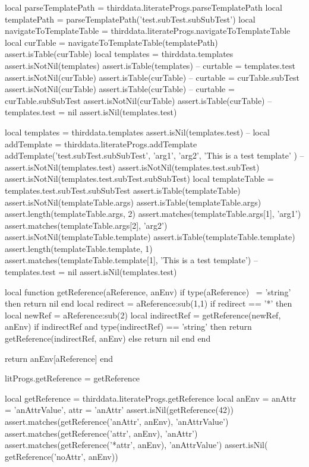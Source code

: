 {{
\startLuaTest
local parseTemplatePath = thirddata.literateProgs.parseTemplatePath
local templatePath = parseTemplatePath('test.subTest.subSubTest')
local navigateToTemplateTable = thirddata.literateProgs.navigateToTemplateTable
local curTable = navigateToTemplateTable(templatePath)
assert.isTable(curTable)
local templates = thirddata.templates
assert.isNotNil(templates)
assert.isTable(templates)
--
curtable = templates.test
assert.isNotNil(curTable)
assert.isTable(curTable)
--
curtable = curTable.subTest
assert.isNotNil(curTable)
assert.isTable(curTable)
--
curtable = curTable.subSubTest
assert.isNotNil(curTable)
assert.isTable(curTable)
--
templates.test = nil
assert.isNil(templates.test)
\stopLuaTest
\stopTestCase

\startLuaTest
local templates = thirddata.templates
assert.isNil(templates.test)
--
local addTemplate = thirddata.literateProgs.addTemplate
addTemplate('test.subTest.subSubTest',
  { 'arg1', 'arg2'},
  'This is a test template'
)
--
assert.isNotNil(templates.test)
assert.isNotNil(templates.test.subTest)
assert.isNotNil(templates.test.subTest.subSubTest)
local templateTable = templates.test.subTest.subSubTest
assert.isTable(templateTable)
assert.isNotNil(templateTable.args)
assert.isTable(templateTable.args)
assert.length(templateTable.args, 2)
assert.matches(templateTable.args[1], 'arg1')
assert.matches(templateTable.args[2], 'arg2')
assert.isNotNil(templateTable.template)
assert.isTable(templateTable.template)
assert.length(templateTable.template, 1)
assert.matches(templateTable.template[1], 'This is a test template')
--
templates.test = nil
assert.isNil(templates.test)
\stopLuaTest
\stopTestCase

\stopTestSuite

\startTestSuite[renderer]

\startLuaCode
local function getReference(aReference, anEnv)
  if type(aReference) ~= 'string' then return nil end
  local redirect = aReference:sub(1,1)
  if redirect == '*' then
    local newRef = aReference:sub(2)
    local indirectRef = getReference(newRef, anEnv)
    if indirectRef and type(indirectRef) == 'string' then
      return getReference(indirectRef, anEnv)
    else
      return nil
    end
  end

  return anEnv[aReference]
end

litProgs.getReference = getReference
\stopLuaCode

\startLuaTest
local getReference = thirddata.literateProgs.getReference
local anEnv = { 
  anAttr = 'anAttrValue',
  attr   = 'anAttr'
}
assert.isNil(getReference(42))
assert.matches(getReference('anAttr', anEnv), 'anAttrValue')
assert.matches(getReference('attr',   anEnv), 'anAttr')
assert.matches(getReference('*attr',  anEnv), 'anAttrValue')
assert.isNil(  getReference('noAttr', anEnv))
\stopLuaTest
\stopTestCase

}}
